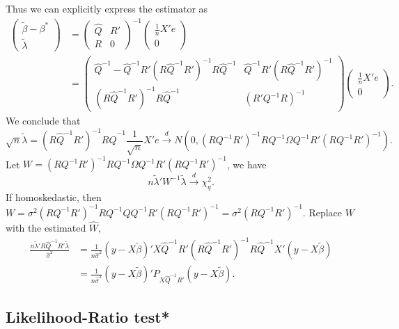 \documentclass[11pt]{article}
\renewcommand{\hat}{\widehat}
\begin{document}
Thus we can explicitly express the estimator as
\[\begin{aligned}
  \begin{pmatrix}\tilde{\beta}-\beta^{*}\\
\tilde{\lambda}
\end{pmatrix}
& =\begin{pmatrix}\widehat{Q} & R'\\
R & 0
\end{pmatrix}^{-1}
\begin{pmatrix}\frac{1}{n}X'e\\
0
\end{pmatrix}\\
 & =  \begin{pmatrix}\widehat{Q}^{-1}-\widehat{Q}^{-1}R'\left(R\widehat{Q}^{-1}R'\right)^{-1}R\widehat{Q}^{-1} & \widehat{Q}^{-1}R'\left(R\widehat{Q}^{-1}R'\right)^{-1}\\
\left(R\widehat{Q}^{-1}R'\right)^{-1}R\widehat{Q}^{-1}  & (R'Q^{-1}R)^{-1}
\end{pmatrix}
\begin{pmatrix}\frac{1}{n}X'e\\
0
\end{pmatrix}.\end{aligned}\]
We conclude that
\[
\sqrt{n}\tilde{\lambda}=\left(R\widehat{Q}^{-1}R'\right)^{-1}R\widehat{Q}^{-1}\frac{1}{\sqrt{n}}X'e \stackrel{d}{\to} N\left(0,\left(RQ^{-1}R'\right)^{-1}RQ^{-1}\Omega Q^{-1}R'\left(RQ^{-1}R'\right)^{-1}\right).\]
Let
\(W=\left(RQ^{-1}R'\right)^{-1}RQ^{-1}\Omega Q^{-1}R'\left(RQ^{-1}R'\right)^{-1}\),
we have
\[n\tilde{\lambda}'W^{-1}\tilde{\lambda}\stackrel{d}{\to} \chi_{q}^{2}.\] If
homoskedastic, then
\(W=\sigma^{2}\left(RQ^{-1}R'\right)^{-1}RQ^{-1}QQ^{-1}R'\left(RQ^{-1}R'\right)^{-1}=\sigma^{2}\left(RQ^{-1}R'\right)^{-1}.\)
Replace $W$ with the estimated $\hat{W}$,
\[\begin{aligned}
\frac{n\tilde{\lambda}'R\hat{Q}^{-1}R'\tilde{\lambda}}{\hat{\sigma}^{2}} 
& =\frac{1}{n\hat{\sigma}^{2}}\left(y-X\tilde{\beta}\right)'X \hat{Q}^{-1} R'
(R \hat{Q}^{-1} R')^{-1}
R \hat{Q}^{-1}
X'\left(y-X\tilde{\beta}\right)\\
 & =\frac{1}{n\hat{\sigma}^{2}}\left(y-X\tilde{\beta}\right)'P_{X \hat{Q}^{-1} R'}\left(y-X\tilde{\beta}\right).\end{aligned}\]

    \subsection{Likelihood-Ratio test*}\label{likelihood-ratio-test}
\end{document}
